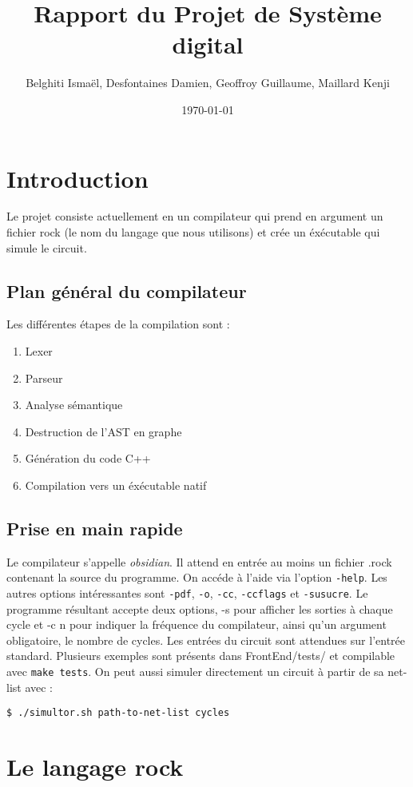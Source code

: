 \documentclass{article}
\title{Rapport du Projet de Système digital \no1}
\author{Belghiti Ismaël, Desfontaines Damien, Geoffroy Guillaume, Maillard Kenji}
\date{\today}
\begin{document}
\maketitle

\section{Introduction}
Le projet consiste actuellement en un compilateur qui prend en argument un fichier rock (le nom du langage que nous utilisons) et crée un éxécutable qui simule le circuit.

\subsection{Plan général du compilateur}
Les différentes étapes de la compilation sont :
\begin{enumerate}
\item Lexer
\item Parseur
\item Analyse sémantique
\item Destruction de l'AST en graphe
\item Génération du code C++
\item Compilation vers un éxécutable natif
\end{enumerate}

\subsection{Prise en main rapide}
Le compilateur s'appelle \emph{obsidian}. Il attend en entrée au moins
un fichier .rock contenant la source du programme. On accéde à l'aide
via l'option \texttt{-help}. Les autres options intéressantes sont
\texttt{-pdf}, \texttt{-o}, \texttt{-cc}, \texttt{-ccflags} et
\texttt{-susucre}. Le programme résultant accepte deux options, -s
pour afficher les sorties à chaque cycle et -c n pour indiquer la
fréquence du compilateur, ainsi qu'un argument obligatoire, le nombre
de cycles. Les entrées du circuit sont attendues sur l'entrée
standard. Plusieurs exemples sont présents dans FrontEnd/tests/ et
compilable avec \texttt{make tests}.
On peut aussi simuler directement un circuit à partir de sa net-list
avec :
\begin{verbatim}
$ ./simultor.sh path-to-net-list cycles
\end{verbatim}
 



\section{Le langage rock}
\end{document}
